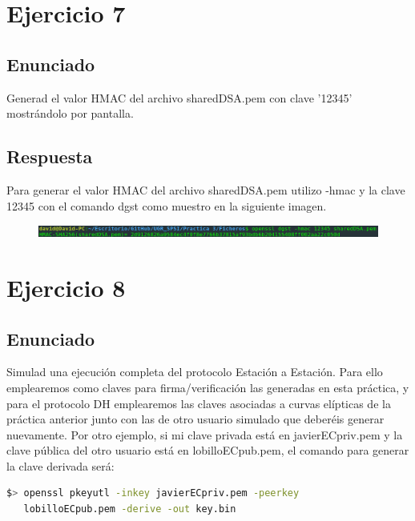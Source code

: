 \documentclass[10pt,a4paper,spanish]{report}
\begin{document}
\chapter{Ejercicio 7}

\section{Enunciado}
\noindent
Generad el valor HMAC del archivo sharedDSA.pem con clave '12345' mostrándolo por pantalla.

\section{Respuesta}
\noindent
Para generar el valor HMAC del archivo sharedDSA.pem utilizo -hmac y la clave 12345 con el comando dgst como muestro en la siguiente imagen.

\begin{figure}[!hbp]
 \centering  \includegraphics[width=1\textwidth]{./Imagenes/7.png}
\end{figure}


\chapter{Ejercicio 8}

\section{Enunciado}
\noindent
Simulad una ejecución completa del protocolo Estación a Estación. Para ello emplearemos como claves para firma/verificación las generadas en esta práctica, y para el protocolo DH emplearemos las claves asociadas a curvas elípticas de la práctica anterior junto con las de otro usuario simulado que deberéis generar nuevamente. Por otro ejemplo, si mi clave privada está en javierECpriv.pem y la clave pública del otro usuario está en lobilloECpub.pem, el comando para generar la clave derivada será:

\begin{lstlisting}[language=bash]
$> openssl pkeyutl -inkey javierECpriv.pem -peerkey
   lobilloECpub.pem -derive -out key.bin
\end{lstlisting}
\end{document}
